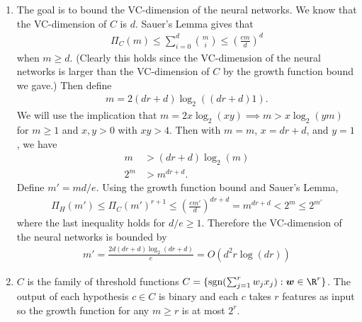 \begin{enumerate}
    \item The goal is to bound the VC-dimension
    of the neural networks.
    We know that the VC-dimension of $C$ is $d$.
    Sauer's Lemma gives that
    \begin{align}
        \Pi_{C}(m)\leq \sum_{i=0}^d\binom{m}{i}
        \leq \left(\frac{em}{d}\right)^d
        \nonumber
    \end{align}
    when $m \geq d$.
    (Clearly this holds since the VC-dimension of the neural networks
    is larger than the VC-dimension of $C$ by the growth
    function bound we gave.)
    Then define
    \begin{align}
        m = 2(dr + d)\log_2((dr+d)1).
        \nonumber
    \end{align}
    We will use the implication that
    $m=2x\log_2(xy) \implies m > x\log_2(ym)$
    for $m\geq 1$ and $x,y>0$ with $xy>4$.
    Then with $m=m$, $x=dr+d$, and $y=1$,
    we have
    \begin{align}
        m &> (dr+d)\log_2(m) \nonumber \\
        2^{m} &>m^{dr+d}.
        \nonumber
    \end{align}
    Define $m'=md/e$.
    Using the growth function bound and Sauer's Lemma,
    \begin{align}
        \Pi_H(m')\leq \Pi_C(m')^{r+1} \leq
        \left(\frac{em'}{d}\right)^{dr+d} = m^{dr+d} < 2^{m} \leq 2^{m'}
        \nonumber
    \end{align}
    where the last inequality holds for $d/e \geq 1$.
    Therefore the VC-dimension of the neural networks
    is bounded by
    \begin{align}
        m' = \frac{2d(dr + d)\log_2(dr+d)}{e}
        = O(d^2r\log(dr))
        \nonumber
    \end{align}
    
    \item $C$ is the family of threshold functions
    $C=\{\textrm{sgn}(\sum_{j=1}^r w_j x_j):\boldsymbol{w}\in\R^r\}$.
    The output of each hypothesis $c\in C$ is binary and
    each $c$ takes $r$ features as input so the growth function for
    any $m\geq r$ is at most $2^r$.


\end{enumerate}
